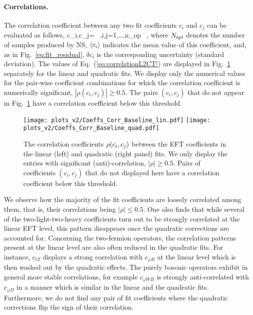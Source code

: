 \paragraph{Correlations.}
%
The correlation coefficient between any two fit coefficients
$c_i$ and $c_j$ can be evaluated as follows,
\be
\label{eq:correlationL2CT}
\rho\lp c_i,c_j\rp= \, ,\qquad i,j=1,\ldots,n_{\rm op} \, ,
\ee
where $N_{\rm spl}$ denotes the number of samples produced by NS, $\la c_i\ra$ indicates
the mean value of this coefficient, and, as in Fig.~\ref{eq:fit_residual},
$\delta c_i$ is the corresponding uncertainty (standard deviation).
%
The values of Eq.~(\ref{eq:correlationL2CT})
are displayed in Fig.~\ref{fig:globalfit-correlations} 
separately for the linear  and quadratic fits.
%
We display only the numerical values for the pair-wise
coefficient combinations for which the correlation coefficient
is numerically significant,
$|\rho(c_i,c_j)|\ge 0.5$.
%
The pairs $(c_i,c_j)$ that do not appear in Fig.~\ref{fig:globalfit-correlations}  have a correlation
coefficient below this threshold.

\begin{figure}[htbp]
  \begin{center}
  \texttt{[image: plots\_v2/Coeffs\_Corr\_Baseline\_lin.pdf]}
  \texttt{[image: plots\_v2/Coeffs\_Corr\_Baseline\_quad.pdf]}
  \vspace{-0.3cm}
  \caption{\small The correlation coefficients $\rho\lp c_i,c_j\rp$
    between the EFT coefficients
      in the linear (left) and quadratic (right panel) fits.
      We only display the  entries with significant (anti)-correlation,
      $|\rho|\ge 0.5$.
      Pairs of coefficients $(c_i,c_j)$ that do not displayed here have a correlation
coefficient below this threshold.
     \label{fig:globalfit-correlations} }
  \end{center}
\end{figure}

We observe how the  majority of
the fit coefficients are  loosely correlated among them, that is,
their correlations being $|\rho| \le 0.5$.
%
One  also finds that while several of the two-light-two-heavy coefficients turn out to be
strongly correlated
at the linear EFT level, this pattern disappears once   the quadratic  corrections
are accounted for.
%
Concerning the two-fermion operators,
the correlation patterns present at the linear level
are also often reduced  in the quadratic fits.
%
For instance, $c_{tZ}$ displays a strong correlation with $c_{\varphi B}$ at the linear level
which is then washed out  by the quadratic effects.
%
The purely bosonic operators exhibit
in general more stable correlations, for example $c_{\varphi W B}$ 
is strongly anti-correlated  with
$c_{\varphi D}$ in a manner which is similar in the linear and the quadratic fits.
%
Furthermore,
we do not find any pair of fit coefficients where the quadratic corrections
flip the sign of their correlation.


